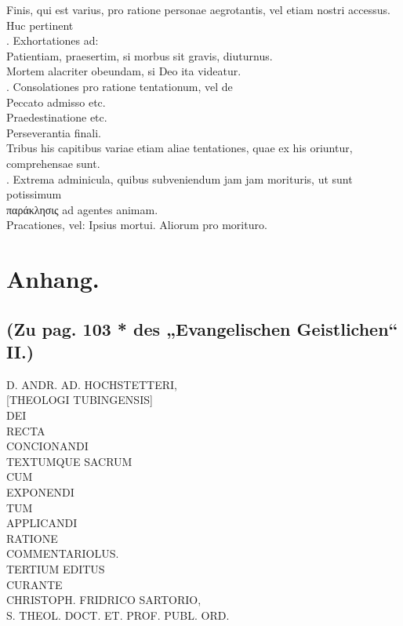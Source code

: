 Finis, qui est varius, pro ratione personae aegrotantis, vel etiam nostri accessus. Huc pertinent\\
. Exhortationes ad:\\
\quad\quad Patientiam, praesertim, si morbus sit gravis, diuturnus.\\
\quad\quad Mortem alacriter obeundam, si Deo ita videatur.\\
. Consolationes pro ratione tentationum, vel de\\
\quad\quad Peccato admisso etc.\\
\quad\quad Praedestinatione etc.\\
\quad\quad Perseverantia finali.\\
\quad\quad Tribus his capitibus variae etiam aliae tentationes, quae ex his oriuntur, comprehensae sunt.\\
. Extrema adminicula, quibus subveniendum jam jam morituris, ut sunt potissimum\\
\quad\quad παράκλησις ad agentes animam.\\
\quad\quad Pracationes, vel: Ipsius mortui. Aliorum pro morituro.
\section*{Anhang.}

\subsection*{(Zu pag. 103 * des „Evangelischen Geistlichen“ II.)}

\begin{center}
{\large D. ANDR. AD. HOCHSTETTERI,}\\[0.6em]
{\large [THEOLOGI TUBINGENSIS]}\\[1.2em]
DEI\\
RECTA\\
CONCIONANDI\\
TEXTUMQUE SACRUM\\
CUM\\
EXPONENDI\\
TUM\\
APPLICANDI\\
RATIONE\\
COMMENTARIOLUS.\\[1em]
TERTIUM EDITUS\\
CURANTE\\
CHRISTOPH. FRIDRICO SARTORIO,\\
S. THEOL. DOCT. ET. PROF. PUBL. ORD.
\end{center}

